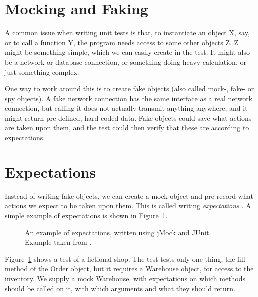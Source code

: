 \section{Mocking and Faking} \label{section-mocking}

A common issue when writing unit tests is that, to instantiate an object X,
say, or to call a function Y, the program needs access to some other objects Z.
Z might be something simple, which we can easily create in the test. It might
also be a network or database connection, or something doing heavy calculation,
or just something complex.

One way to work around this is to create fake objects (also called mock-, fake-
or spy objects). A fake network connection has the same interface as a real
network connection, but calling it does not actually transmit anything
anywhere, and it might return pre-defined, hard coded data. Fake objects could
save what actions are taken upon them, and the test could then verify that
these are according to expectations.


\section{Expectations} \label{section-expectations}

Instead of writing fake objects, we can create a mock object and pre-record
what actions we expect to be taken upon them. This is called writing
\textit{expectations} \cite{fowler07expectations}. A simple example of
expectations is shown in Figure~\ref{figure-expectations}.

\begin{figure}[h!]
	\begin{center}
	\begin{minipage}{0.9\textwidth}
		\lstset{language=Java}
		
	\end{minipage}
	\end{center}

	\caption{An example of expectations, written using jMock and JUnit.
	Example taken from \cite{fowler07expectations}.}
	\label{figure-expectations}
\end{figure}

Figure~\ref{figure-expectations} shows a test of a fictional shop. The test
tests only one thing, the fill method of the Order object, but it requires a
Warehouse object, for access to the inventory. We supply a mock Warehouse, with
expectations on which methods should be called on it, with which arguments and
what they should return.

